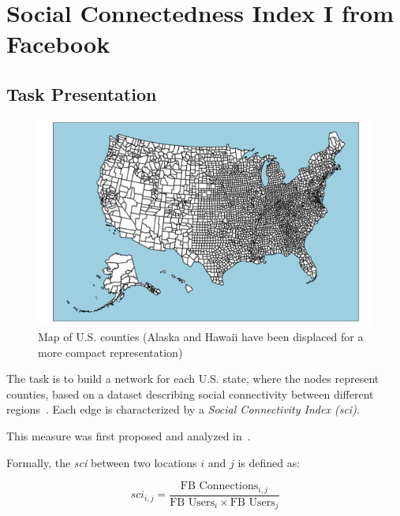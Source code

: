 \chapter{Social Connectedness Index I from Facebook}

\section{Task Presentation}

\begin{figure}[h]
    \centering
    \begin{minipage}[c]{0.7\textwidth}
        \includegraphics[width=\textwidth]{images/task43/U.S. counties.png}
    \end{minipage}%
    \begin{minipage}[c]{0.4\textwidth}
        \caption{Map of U.S. counties (Alaska and Hawaii have been displaced for a more compact representation)}
        \label{fig:us_counties}
    \end{minipage}
\end{figure}

The task is to build a network for each U.S. state, where the nodes represent counties, based on a dataset describing social connectivity between different regions~\cite{sciFacebook}. Each edge is characterized by a \textsl{Social Connectivity Index (sci)}.

This measure was first proposed and analyzed in~\cite{bai2018sci}.

Formally, the \textsl{sci} between two locations $i$ and $j$ is defined as:

\begin{equation}
    sci_{i,j} = \frac{\text{FB Connections}_{i,j}}{\text{FB Users}_i \times \text{FB Users}_j}
\end{equation}

